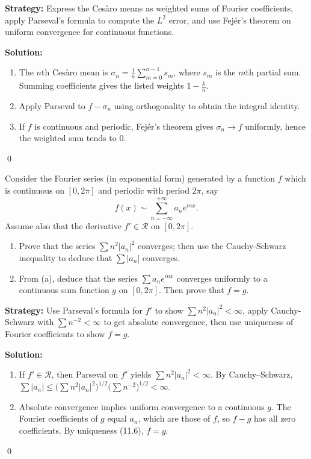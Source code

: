 \noindent\textbf{Strategy:} Express the Cesàro means as weighted sums of Fourier coefficients, apply Parseval's formula to compute the $L^2$ error, and use Fejér's theorem on uniform convergence for continuous functions.

\bigskip\noindent\textbf{Solution:}
\begin{enumerate}[label=(\alph*)]
\item The $n$th Cesàro mean is $\sigma_n=\tfrac{1}{n}\sum_{m=0}^{n-1} s_m$, where $s_m$ is the $m$th partial sum. Summing coefficients gives the listed weights $1-\tfrac{k}{n}$.
\item Apply Parseval to $f-\sigma_n$ using orthogonality to obtain the integral identity.
\item If $f$ is continuous and periodic, Fejér's theorem gives $\sigma_n\to f$ uniformly, hence the weighted sum tends to $0$.
\end{enumerate}\qed


\begin{problembox}
\begin{problemstatement}
Consider the Fourier series (in exponential form) generated by a function $f$ which is continuous on $[0, 2\pi]$ and periodic with period $2\pi$, say
\[
f(x) \sim \sum_{n=-\infty}^{+\infty} a_n e^{inx}.
\]
Assume also that the derivative $f' \in \mathcal{R}$ on $[0, 2\pi]$. 
\begin{enumerate}[label=(\alph*)]
\item Prove that the series $\sum n^2 |a_n|^2$ converges; then use the Cauchy-Schwarz inequality to deduce that $\sum |a_n|$ converges.
\item From (a), deduce that the series $\sum a_n e^{inx}$ converges uniformly to a continuous sum function $g$ on $[0, 2\pi]$. Then prove that $f = g$.
\end{enumerate}
\end{problemstatement}
\end{problembox}

\noindent\textbf{Strategy:} Use Parseval's formula for $f'$ to show $\sum n^2|a_n|^2<\infty$, apply Cauchy-Schwarz with $\sum n^{-2}<\infty$ to get absolute convergence, then use uniqueness of Fourier coefficients to show $f=g$.

\bigskip\noindent\textbf{Solution:}
\begin{enumerate}[label=(\alph*)]
\item If $f'\in\mathcal R$, then Parseval on $f'$ yields $\sum n^2|a_n|^2<\infty$. By Cauchy–Schwarz, $\sum |a_n|\le\big(\sum n^2|a_n|^2\big)^{1/2}\big(\sum n^{-2}\big)^{1/2}<\infty$.
\item Absolute convergence implies uniform convergence to a continuous $g$. The Fourier coefficients of $g$ equal $a_n$, which are those of $f$, so $f-g$ has all zero coefficients. By uniqueness (11.6), $f=g$.
\end{enumerate}\qed
